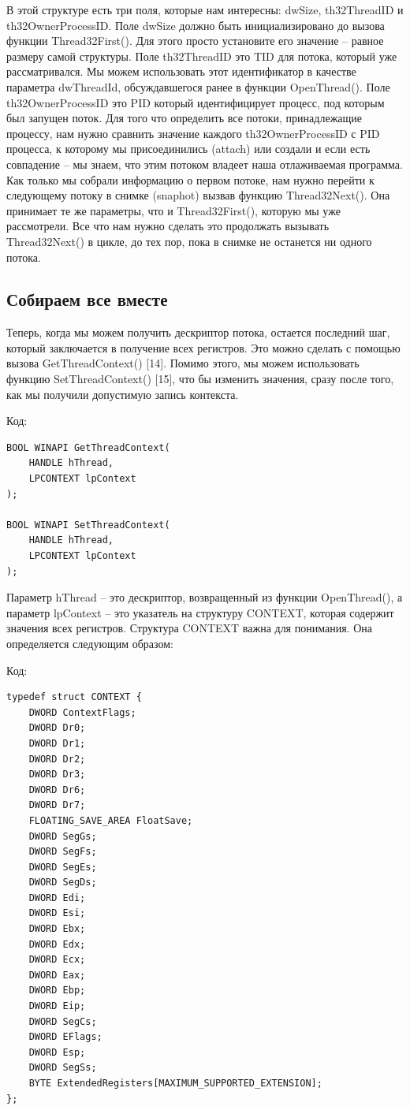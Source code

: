 \documentclass[12pt, a4paper, oneside]{book}
\begin{document}
В этой структуре есть три поля, которые нам интересны: dwSize, th32ThreadID и th32OwnerProcessID. Поле dwSize должно быть инициализировано до вызова функции Thread32First(). Для этого просто установите его значение – равное размеру самой структуры. Поле th32ThreadID это TID для потока, который уже рассматривался. Мы можем использовать этот идентификатор в качестве параметра dwThreadId, обсуждавшегося ранее в функции OpenThread(). Поле th32OwnerProcessID это PID который идентифицирует процесс, под которым был запущен поток. Для того что определить все потоки, принадлежащие процессу, нам нужно сравнить значение каждого th32OwnerProcessID с PID процесса, к которому мы присоединились (attach) или создали и если есть совпадение – мы знаем, что этим потоком владеет наша отлаживаемая программа. Как только мы собрали информацию о первом потоке, нам нужно перейти к следующему потоку в снимке (snaphot) вызвав функцию Thread32Next(). Она принимает те же параметры, что и Thread32First(), которую мы уже рассмотрели. Все что нам нужно сделать это продолжать вызывать Thread32Next() в цикле, до тех пор, пока в снимке не останется ни одного потока.

\subsection{Собираем все вместе}

Теперь, когда мы можем получить дескриптор потока, остается последний шаг, который заключается в получение всех регистров. Это можно сделать с помощью вызова GetThreadContext() [14]. Помимо этого, мы можем использовать функцию SetThreadContext() [15], что бы изменить значения, сразу после того, как мы получили допустимую запись контекста.

Код:
\begin{verbatim}
BOOL WINAPI GetThreadContext(
    HANDLE hThread,
    LPCONTEXT lpContext
);

BOOL WINAPI SetThreadContext(
    HANDLE hThread,
    LPCONTEXT lpContext
);
\end{verbatim}

Параметр hThread – это дескриптор, возвращенный из функции OpenThread(), а параметр lpContext – это указатель на структуру CONTEXT, которая содержит значения всех регистров. Структура CONTEXT важна для понимания. Она определяется следующим образом: 

Код:
\begin{verbatim}
typedef struct CONTEXT {
    DWORD ContextFlags;
    DWORD Dr0;
    DWORD Dr1;
    DWORD Dr2;
    DWORD Dr3;
    DWORD Dr6;
    DWORD Dr7;
    FLOATING_SAVE_AREA FloatSave;
    DWORD SegGs;
    DWORD SegFs;
    DWORD SegEs;
    DWORD SegDs;
    DWORD Edi;
    DWORD Esi;
    DWORD Ebx;
    DWORD Edx;
    DWORD Ecx;
    DWORD Eax;
    DWORD Ebp;
    DWORD Eip;
    DWORD SegCs;
    DWORD EFlags;
    DWORD Esp;
    DWORD SegSs;
    BYTE ExtendedRegisters[MAXIMUM_SUPPORTED_EXTENSION];
};
\end{verbatim}
\end{document}
